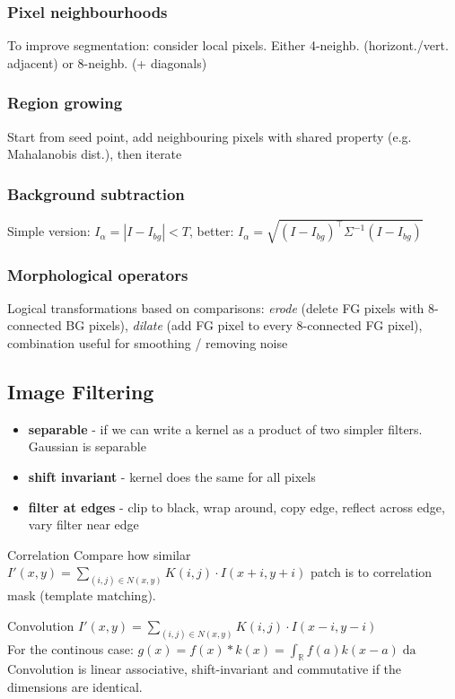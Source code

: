 \documentclass[a4paper,10pt]{article}
\begin{document}
\subsubsection{Pixel neighbourhoods}
To improve segmentation: consider local pixels. Either 4-neighb. (horizont./vert. adjacent) or 8-neighb. (+ diagonals)

\subsubsection{Region growing}
Start from seed point, add neighbouring pixels with shared property (e.g. Mahalanobis dist.), then iterate

\subsubsection{Background subtraction}
Simple version: \( I_\alpha = \left| I - I_{bg} \right| < T \), better: \( I_\alpha = \sqrt{(I-I_{bg})^\top \Sigma^{-1} (I-I_{bg})}  \)

\subsubsection{Morphological operators} 
Logical transformations based on comparisons: \textit{erode} (delete FG pixels with 8-connected BG pixels), \textit{dilate} (add FG pixel to every 8-connected FG pixel), combination useful for smoothing / removing noise

\subsection{Image Filtering}
\begin{itemize}
    \item \textbf{separable} - if we can write a kernel as a product of two simpler filters. Gaussian is separable
    \item \textbf{shift invariant} - kernel does the same for all pixels
    \item \textbf{filter at edges} - clip to black, wrap around, copy edge, reflect across edge, vary filter near edge
\end{itemize}
\begin{mainbox}{Correlation}
    Compare how similar \( I'(x,y) = \sum_{(i,j) \in N(x,y)} K(i,j) \cdot I(x+i,y+i) \) patch is to correlation mask (template matching).
\end{mainbox}

\begin{mainbox}{Convolution}
    \( I'(x,y) = \sum_{(i,j) \in N(x,y)} K(i,j) \cdot I(x-i, y-i) \)\\
    For the continous case: \( g(x) = f(x) * k(x) = \int_\mathbb{R} f(a) k(x-a) \mathop{da}  \)\\
    Convolution is linear associative, shift-invariant and commutative if the dimensions are identical.
\end{mainbox}
\end{document}
